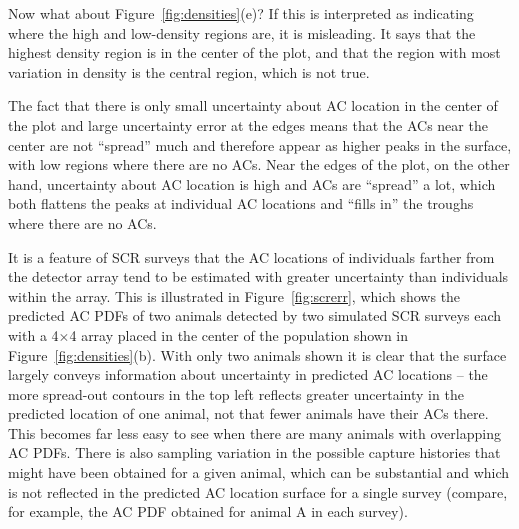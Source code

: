 \documentclass[useAMS,usenatbib,referee]{biom}
\begin{document}
Now what about Figure~\ref{fig:densities}(e)? If this is interpreted as indicating where the high and low-density regions are, it is misleading. It says that the highest density region is in the center of the plot, and that the region with most variation in density is the central region, which is not true. 

The fact that there is only small uncertainty about AC location in the center of the plot and large uncertainty error at the edges means that the ACs near the center are not ``spread'' much and therefore appear as higher peaks in the surface, with low regions where there are no ACs. Near the edges of the plot, on the other hand, uncertainty about AC location is high and ACs are ``spread'' a lot, which both flattens the peaks at individual AC locations and ``fills in'' the troughs where there are no ACs. 

It is a feature of SCR surveys that the AC locations of individuals farther from the detector array tend to be estimated with greater uncertainty than individuals within the array. This is illustrated in Figure~\ref{fig:screrr}, which shows the predicted AC PDFs of two animals detected by two simulated SCR surveys each with a 4$\times$4 array placed in the center of the population shown in Figure~\ref{fig:densities}(b). With only two animals shown it is clear that the surface largely conveys information about uncertainty in predicted AC locations -- the more spread-out contours in the top left reflects greater uncertainty in the predicted location of one animal, not that fewer animals have their ACs there. This becomes far less easy to see when there are many animals with overlapping AC PDFs. There is also sampling variation in the possible capture histories that might have been obtained for a given animal, which can be substantial and which is not reflected in the predicted AC location surface for a single survey (compare, for example, the AC PDF obtained for animal A in each survey). 

\end{document}
